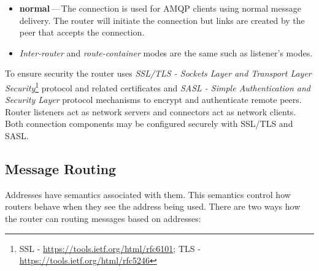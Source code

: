 \begin{description}
	\begin{itemize}
		\setlength\itemsep{0em}
		\item \textbf{normal}\,---\,The connection is used for AMQP clients using normal message delivery. The router will initiate the connection but links are created by the peer that accepts the connection.
		\item \emph{Inter-router} and \emph{route-container} modes are the same such as listener's modes.
	\end{itemize}
\end{description}


To ensure security the router uses \emph{SSL/TLS - Sockets Layer and Transport Layer Security}\footnote{SSL - \url{https://tools.ietf.org/html/rfc6101}; TLS - \url{https://tools.ietf.org/html/rfc5246}} protocol and related certificates and \emph{SASL - Simple Authentication and Security Layer}\footnotemark{} protocol mechanisms to encrypt and authenticate remote peers. Router listeners act as network servers and connectors act as network clients. Both connection components may be configured securely with SSL/TLS and SASL.



\subsection{Message Routing}
\label{Message Routing}
Addresses have semantics associated with them. This semantics control how routers behave when they see the address being used. There are two ways how the router can routing messages based on addresses:

